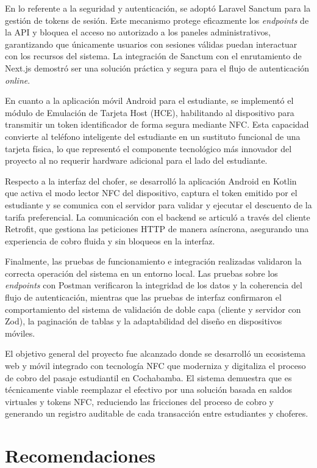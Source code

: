 \documentclass[12pt,letterpaper]{report}
\begin{document}
	En lo referente a la seguridad y autenticación, se adoptó Laravel Sanctum para la gestión de tokens de sesión. Este mecanismo protege eficazmente los \textit{endpoints} de la API y bloquea el acceso no autorizado a los paneles administrativos, garantizando que únicamente usuarios con sesiones válidas puedan interactuar con los recursos del sistema. La integración de Sanctum con el enrutamiento de Next.js demostró ser una solución práctica y segura para el flujo de autenticación \textit{online}.
	
	En cuanto a la aplicación móvil Android para el estudiante, se implementó el módulo de Emulación de Tarjeta Host (HCE), habilitando al dispositivo para transmitir un token identificador de forma segura mediante NFC. Esta capacidad convierte al teléfono inteligente del estudiante en un sustituto funcional de una tarjeta física, lo que representó el componente tecnológico más innovador del proyecto al no requerir hardware adicional para el lado del estudiante.
	
	Respecto a la interfaz del chofer, se desarrolló la aplicación Android en Kotlin que activa el modo lector NFC del dispositivo, captura el token emitido por el estudiante y se comunica con el servidor para validar y ejecutar el descuento de la tarifa preferencial. La comunicación con el backend se articuló a través del cliente Retrofit, que gestiona las peticiones HTTP de manera asíncrona, asegurando una experiencia de cobro fluida y sin bloqueos en la interfaz.
	
	Finalmente, las pruebas de funcionamiento e integración realizadas validaron la correcta operación del sistema en un entorno local. Las pruebas sobre los \textit{endpoints} con Postman verificaron la integridad de los datos y la coherencia del flujo de autenticación, mientras que las pruebas de interfaz confirmaron el comportamiento del sistema de validación de doble capa (cliente y servidor con Zod), la paginación de tablas y la adaptabilidad del diseño en dispositivos móviles.
	
	El objetivo general del proyecto fue alcanzado donde se desarrolló un ecosistema web y móvil integrado con tecnología NFC que moderniza y digitaliza el proceso de cobro del pasaje estudiantil en Cochabamba. El sistema demuestra que es técnicamente viable reemplazar el efectivo por una solución basada en saldos virtuales y tokens NFC, reduciendo las fricciones del proceso de cobro y generando un registro auditable de cada transacción entre estudiantes y choferes.
	
	\section{Recomendaciones}
	
\end{document}
